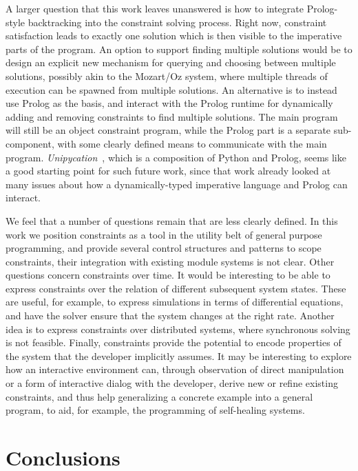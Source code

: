 A larger question that this work leaves unanswered is how to integrate
Prolog-style backtracking into the constraint solving process. Right now,
constraint satisfaction leads to exactly one solution which is then visible to
the imperative parts of the program. An option to support finding multiple
solutions would be to design an explicit new mechanism for querying and choosing
between multiple solutions, possibly akin to the Mozart/Oz system, where
multiple threads of execution can be spawned from multiple solutions. An
alternative is to instead use Prolog as the basis, and interact with the Prolog
runtime for dynamically adding and removing constraints to find multiple
solutions.  The main program will still be an object constraint program, while
the Prolog part is a separate sub-component, with some clearly defined means to
communicate with the main program. \emph{Unipycation}~\cite{unipycation}, which
is a composition of Python and Prolog, seems like a good starting point for such
future work, since that work already looked at many issues about how a
dynamically-typed imperative language and Prolog can interact.

We feel that a number of questions remain that are less clearly
defined. In this work we position constraints as a tool in the utility
belt of general purpose programming, and provide several control
structures and patterns to scope constraints, their integration with
existing module systems is not clear. Other questions concern
constraints over time. It would be interesting to be able to express
constraints over the relation of different subsequent system
states. These are useful, for example, to express simulations in terms
of differential equations, and have the solver ensure that the system
changes at the right rate. Another idea is to express constraints over
distributed systems, where synchronous solving is not
feasible. Finally, constraints provide the potential to encode
properties of the system that the developer implicitly assumes. It may
be interesting to explore how an interactive environment can, through
observation of direct manipulation or a form of interactive dialog
with the developer, derive new or refine existing constraints, and
thus help generalizing a concrete example into a general program, to aid,
for example, the programming of self-healing systems.

\section{Conclusions}
\label{cha:conclusions}

